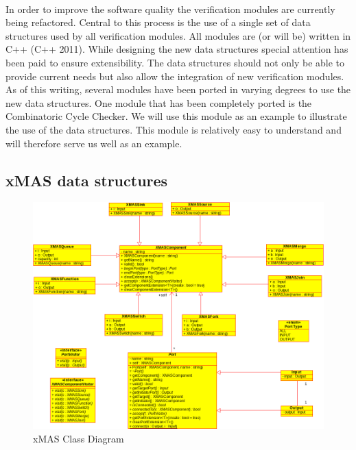 \documentclass[a4paper,11pt]{article}
\begin{document}
\paragraph{}
In order to improve the software quality the verification modules are currently being refactored.
Central to this process is the use of a single set of data structures used by all verification modules.
All modules are (or will be) written in C++ (C++ 2011). While designing the new data structures
special attention has been paid to ensure extensibility. The data structures should not only be
able to provide current needs but also allow the integration of new verification modules. As of this
writing, several modules have been ported in varying degrees to use the new data structures. One
module that has been completely ported is the Combinatoric Cycle Checker. We will use this module
as an example to illustrate the use of the data structures. This module is relatively easy to
understand and will therefore serve us well as an example.

\subsection{xMAS data structures}


\begin{figure}[h]
 \includegraphics[width=\textwidth]{images/xmas-components}
 \caption{xMAS Class Diagram}
 \label{fig:xmas-components}
\end{figure}
\end{document}
